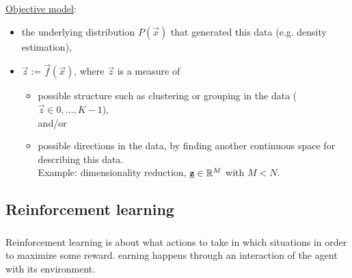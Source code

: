 \begin{frame}

\underline{Objective model}:
\begin{itemize}
\item the underlying distribution $P(\vec x)$ that generated this data (e.g. density estimation),
\item $\vec z := \vec f(\vec x)$, where $\vec z$ is a measure of 
\begin{itemize}
\item possible structure such as clustering or grouping in the data ($\vec z \in {0,\ldots,K-1}$), \\

and/or

\item possible directions in the data, by finding another continuous space for describing this data. \\

Example: dimensionality reduction, $\underline{\mathbf{z}} \in \mathbb{R}^M$ with $M < N$.

\end{itemize}
\end{itemize}

\end{frame}

\newpage

\subsection{Reinforcement learning} \label{sec:reinforcement}

\begin{frame}\frametitle{\subsecname}

Reinforcement learning is about what actions to take in which situations in order to maximize some reward.
\slidesonly{\\L}earning happens through an interaction of the agent with its environment.

\end{frame}

